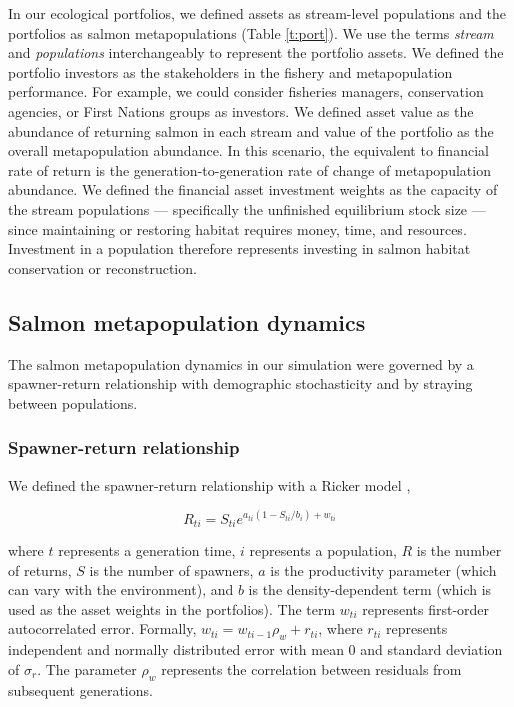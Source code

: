 In our ecological portfolios, we defined assets as stream-level populations and the portfolios as salmon metapopulations (Table \ref{t:port}). We use the terms \emph{stream} and \emph{populations} interchangeably to represent the portfolio assets. We defined the portfolio investors as the stakeholders in the fishery and metapopulation performance. For example, we could consider fisheries managers, conservation agencies, or First Nations groups as investors. We defined asset value as the abundance of returning salmon in each stream and value of the portfolio as the overall metapopulation abundance. In this scenario, the equivalent to financial rate of return is the generation-to-generation rate of change of metapopulation abundance. We defined the financial asset investment weights as the capacity of the stream populations --- specifically the unfinished equilibrium stock size --- since maintaining or restoring habitat requires money, time, and resources. Investment in a population therefore represents investing in salmon habitat conservation or reconstruction.

\subsection{Salmon metapopulation dynamics}

The salmon metapopulation dynamics in our simulation were governed by a spawner-return relationship with demographic stochasticity and by straying between populations.

\subsubsection{Spawner-return relationship}

We defined the spawner-return relationship with a Ricker model \citep{ricker1954},

\begin{equation}
R_{ti} = S_{ti}e^{a_{ti}(1-S_{ti}/b_i) + w_{ti}}
\end{equation}

\noindent where $t$ represents a generation time, $i$ represents a population, $R$ is the number of returns, $S$ is the number of spawners, $a$ is the productivity parameter (which can vary with the environment), and $b$ is the density-dependent term (which is used as the asset weights in the portfolios). The term $w_{ti}$ represents first-order autocorrelated error. Formally, $w_{ti} = w_{ti-1} \rho_w + r_{ti}$, where $r_{ti}$ represents independent and normally distributed error with mean 0 and standard deviation of $\sigma_r$. The parameter $\rho_w$ represents the correlation between residuals from subsequent generations.

